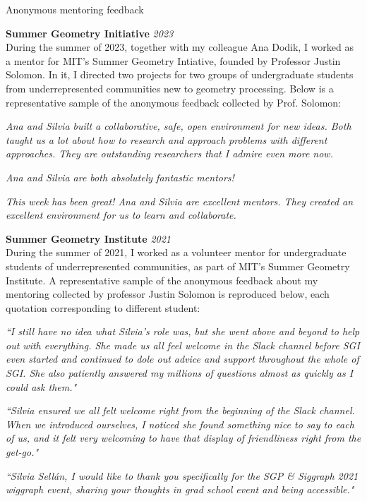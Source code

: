 \documentclass{resume}
\newcommand{\cvitem}[3]{
    {\bf #1} \hfill {\em \small #2} \\ 
    {\small#3 }
}
\newcommand{\feedback}[1]{\it \small #1}
\begin{document}
\begin{rSection}{Anonymous mentoring feedback}

\cvitem{Summer Geometry Initiative}{2023}{During the summer of 2023, together with my colleague Ana Dodik, I worked as a mentor for MIT's Summer Geometry Intiative, founded by Professor Justin Solomon. In it, I directed two projects for two groups of undergraduate students from underrepresented communities new to geometry processing. Below is a representative sample of the anonymous feedback collected by Prof. Solomon:}

\feedback{Ana and Silvia built a collaborative, safe, open environment for new ideas. Both taught us a lot about how to research and approach problems with different approaches. They are outstanding researchers that I admire even more now.}

\feedback{Ana and Silvia are both absolutely fantastic mentors!}

\feedback{This week has been great! Ana and Silvia are excellent mentors. They created an excellent environment for us to learn and collaborate.}

\cvitem{Summer Geometry Institute}{2021}{During the summer of 2021, I worked as a volunteer mentor for undergraduate students of underrepresented communities, as part of MIT's Summer Geometry Institute. A representative sample of the anonymous feedback about my mentoring collected by professor Justin Solomon is reproduced below, each quotation corresponding to different student:}

\feedback{``I still have no idea what Silvia's role was, but she went above and beyond to help out with everything. She made us all feel welcome in the Slack channel before SGI even started and continued to dole out advice and support throughout the whole of SGI. She also patiently answered my millions of questions almost as quickly as I could ask them."}

\feedback{``Silvia ensured we all felt welcome right from the beginning of the Slack channel. When we introduced ourselves, I noticed she found something nice to say to each of us, and it felt very welcoming to have that display of friendliness right from the get-go."}

\feedback{``Silvia Sellán, I would like to thank you specifically for the SGP \& Siggraph 2021 wiggraph event, sharing your thoughts in grad school event and being accessible."}

\end{rSection}
\end{document}
